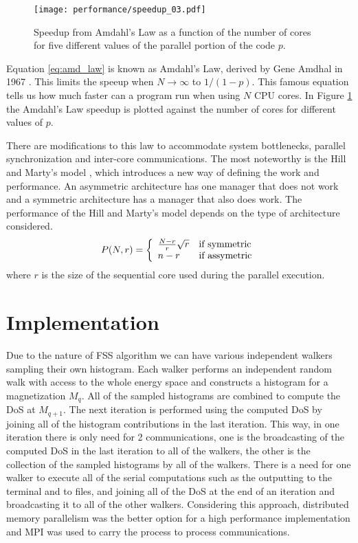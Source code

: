 \begin{figure}[h]
	\centering
	\texttt{[image: performance/speedup\_03.pdf]}
	\caption{Speedup from Amdahl's Law as a function of the number of cores for five different values of the parallel portion of the code $p$.}
	\label{amd_law}
\end{figure}

Equation \ref{eq:amd_law} is known as Amdahl's Law, derived by Gene Amdhal in 1967 \cite{Amdahl1967}. This limits the speeup when $N \rightarrow \infty$ to $1/(1-p)$. This famous equation tells us how much faster can a program run when using $N$ CPU cores. In Figure \ref{amd_law} the Amdahl's Law speedup is plotted against the number of cores for different values of $p$.

	There are modifications to this law \cite{On2014} to accommodate system bottlenecks, parallel synchronization and inter-core communications. The most noteworthy is the Hill and Marty's model \cite{Hill2008}, which introduces a new way of defining the work and performance. An asymmetric architecture has one manager that does not work and a symmetric architecture has a manager that also does work. The performance of the Hill and Marty's model depends on the type of architecture considered. 
\begin{equation}
		P(N, r) = \left\{ \begin{array}{ll}  \frac{N-r}{r} \sqrt{r}  & \mbox{if } \text{symmetric} \\ n-r & \mbox{if } \text{assymetric} \end{array} \right.
\end{equation}
where $r$ is the size of the sequential core used during the parallel execution. 


\section{Implementation}

	Due to the nature of FSS algorithm we can have various independent walkers sampling their own histogram. Each walker performs an independent random walk with access to the whole energy space and constructs a histogram for a magnetization $M_q$. All of the sampled histograms are combined to compute the DoS at $M_{q+1}$. The next iteration is performed using the computed DoS by joining all of the histogram contributions in the last iteration.
This way, in one iteration there is only need for 2 communications, one is the broadcasting of the computed DoS in the last iteration to all of the walkers, the other is the collection of the sampled histograms by all of the walkers. There is a need for one walker to execute all of the serial computations such as the outputting to the terminal and to files, and joining all of the DoS at the end of an iteration and broadcasting it to all of the other walkers. Considering this approach, distributed memory parallelism was the better option for a high performance implementation and MPI was used to carry the process to process communications.
	
